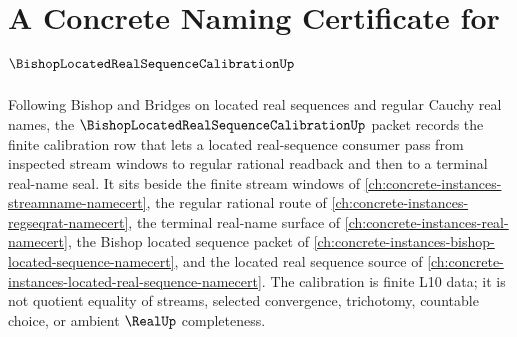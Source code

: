\chapter{A Concrete Naming Certificate for $\BishopLocatedRealSequenceCalibrationUp$}
\label{ch:concrete-instances-bishop-located-real-sequence-calibration-namecert}

Following Bishop and Bridges on located real sequences and regular Cauchy real names, the $\BishopLocatedRealSequenceCalibrationUp$ packet records the finite calibration row that lets a located real-sequence consumer pass from inspected stream windows to regular rational readback and then to a terminal real-name seal. It sits beside the finite stream windows of \autoref{ch:concrete-instances-streamname-namecert}, the regular rational route of \autoref{ch:concrete-instances-regseqrat-namecert}, the terminal real-name surface of \autoref{ch:concrete-instances-real-namecert}, the Bishop located sequence packet of \autoref{ch:concrete-instances-bishop-located-sequence-namecert}, and the located real sequence source of \autoref{ch:concrete-instances-located-real-sequence-namecert}. The calibration is finite L10 data; it is not quotient equality of streams, selected convergence, trichotomy, countable choice, or ambient $\RealUp$ completeness.

